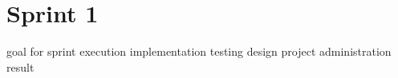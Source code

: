 \chapter{Sprint 1}
goal for sprint
execution
implementation
testing
design
project administration
result